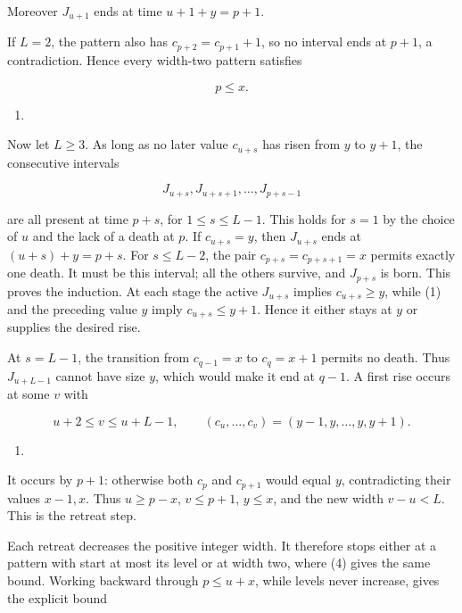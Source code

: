 \documentclass[11pt,a4paper]{article}
\providecommand{\tightlist}{\setlength{\itemsep}{0pt}\setlength{\parskip}{0pt}}
\begin{document}
Moreover \(J_{u+1}\) ends at time \(u+1+y=p+1\).

If \(L=2\), the pattern also has \(c_{p+2}=c_{p+1}+1\), so no interval ends at \(p+1\), a contradiction. Hence every width-two pattern satisfies

\[
p\le x.
\]

\begin{enumerate}
\def\labelenumi{(\arabic{enumi})}
\setcounter{enumi}{3}
\tightlist
\item
\end{enumerate}

Now let \(L\ge3\). As long as no later value \(c_{u+s}\) has risen from \(y\) to \(y+1\), the consecutive intervals

\[
J_{u+s},J_{u+s+1},\ldots,J_{p+s-1}
\]

are all present at time \(p+s\), for \(1\le s\le L-1\). This holds for \(s=1\) by the choice of \(u\) and the lack of a death at \(p\). If \(c_{u+s}=y\), then \(J_{u+s}\) ends at \((u+s)+y=p+s\). For \(s\le L-2\), the pair \(c_{p+s}=c_{p+s+1}=x\) permits exactly one death. It must be this interval; all the others survive, and \(J_{p+s}\) is born. This proves the induction. At each stage the active \(J_{u+s}\) implies \(c_{u+s}\ge y\), while (1) and the preceding value \(y\) imply \(c_{u+s}\le y+1\). Hence it either stays at \(y\) or supplies the desired rise.

At \(s=L-1\), the transition from \(c_{q-1}=x\) to \(c_q=x+1\) permits no death. Thus \(J_{u+L-1}\) cannot have size \(y\), which would make it end at \(q-1\). A first rise occurs at some \(v\) with

\[
u+2\le v\le u+L-1,
\qquad(c_u,\ldots,c_v)=(y-1,y,\ldots,y,y+1).
\]

\begin{enumerate}
\def\labelenumi{(\arabic{enumi})}
\setcounter{enumi}{4}
\tightlist
\item
\end{enumerate}

It occurs by \(p+1\): otherwise both \(c_p\) and \(c_{p+1}\) would equal \(y\), contradicting their values \(x-1,x\). Thus \(u\ge p-x\), \(v\le p+1\), \(y\le x\), and the new width \(v-u<L\). This is the retreat step.

Each retreat decreases the positive integer width. It therefore stops either at a pattern with start at most its level or at width two, where (4) gives the same bound. Working backward through \(p\le u+x\), while levels never increase, gives the explicit bound
\end{document}
